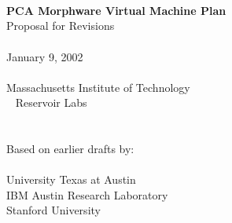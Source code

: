 \documentclass[10pt]{article}
\begin{document}
  \begin{titlepage}
    \begin{center}
      {\LARGE
	~ \\ ~ \\ ~ \\ ~ \\ ~ \\ ~ \\ ~ \\ ~ \\
	{\bf PCA Morphware Virtual Machine Plan} \\ 
	Proposal for Revisions \\ ~ \\ 
      }
      {\Large
	January 9, 2002 \\ ~ \\
      }
      {\large
	Massachusetts Institute of Technology \\ ~ Reservoir Labs \\ ~ \\ ~ \\ 
	Based on earlier drafts by: \\ ~ \vspace{-8pt} \\
	University Texas at Austin \\ IBM Austin Research Laboratory \\ Stanford University
      }
    \end{center}
  \end{titlepage}

  \newcommand{\mt}[1]{\mbox{\it #1}}
  \newcommand{\todo}[1]{\framebox{\bf #1}}
  \newcommand{\sss}[1]{\medskip \noindent {\bf #1} \smallskip}
  \newcommand{\ssss}[1]{\medskip \noindent {\bf #1:}}

  
  
  

% 
% 
  
\end{document}
